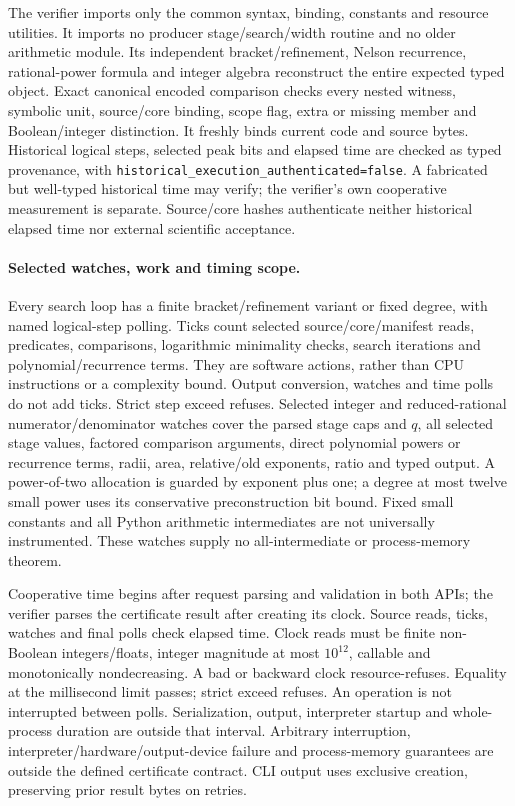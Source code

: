 The verifier imports only the common syntax, binding, constants and resource
utilities. It imports no producer stage/search/width routine and no older
arithmetic module. Its independent bracket/refinement, Nelson recurrence,
rational-power formula and integer algebra reconstruct the entire expected
typed object. Exact canonical encoded comparison checks every nested witness,
symbolic unit, source/core binding, scope flag, extra or missing member and
Boolean/integer distinction. It freshly binds current code and source bytes.
Historical logical steps, selected peak bits and elapsed time are checked as
typed provenance, with \texttt{historical\_execution\_authenticated=false}.
A fabricated but well-typed historical time may verify; the verifier's own
cooperative measurement is separate. Source/core hashes authenticate neither
historical elapsed time nor external scientific acceptance.

\paragraph{Selected watches, work and timing scope.}
Every search loop has a finite bracket/refinement variant or fixed degree,
with named logical-step polling. Ticks count selected source/core/manifest
reads, predicates, comparisons, logarithmic minimality checks, search
iterations and polynomial/recurrence terms. They are software actions,
rather than CPU instructions or a complexity bound. Output conversion,
watches and time polls do not add ticks. Strict step exceed refuses.
Selected integer and reduced-rational numerator/denominator watches cover
the parsed stage caps and $q$, all selected stage values, factored comparison
arguments, direct polynomial powers or recurrence terms, radii, area,
relative/old exponents, ratio and typed output. A power-of-two allocation is
guarded by exponent plus one; a degree at most twelve small power uses its
conservative preconstruction bit bound. Fixed small constants and all Python
arithmetic intermediates are not universally instrumented. These watches
supply no all-intermediate or process-memory theorem.

Cooperative time begins after request parsing and validation in both APIs;
the verifier parses the certificate result after creating its clock.
Source reads, ticks, watches and final polls check elapsed time. Clock reads
must be finite non-Boolean integers/floats, integer magnitude at most
$10^{12}$, callable and monotonically nondecreasing. A bad or backward clock
resource-refuses. Equality at the millisecond limit passes; strict exceed
refuses. An operation is not interrupted between polls. Serialization,
output, interpreter startup and whole-process duration are outside that
interval. Arbitrary interruption, interpreter/hardware/output-device failure
and process-memory guarantees are outside the defined certificate contract.
CLI output uses exclusive creation, preserving prior result bytes on retries.

